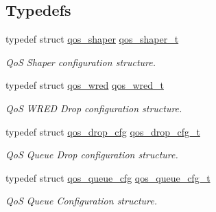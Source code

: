 \subsection*{Typedefs}
\begin{DoxyCompactItemize}
\item 
\hypertarget{group__FAPI__QOS__QUEUE_ga05ce7ada7ae20b289d4e675ad099c8f0}{typedef struct \hyperlink{structqos__shaper}{qos\-\_\-shaper} \hyperlink{group__FAPI__QOS__QUEUE_ga05ce7ada7ae20b289d4e675ad099c8f0}{qos\-\_\-shaper\-\_\-t}}\label{group__FAPI__QOS__QUEUE_ga05ce7ada7ae20b289d4e675ad099c8f0}

\begin{DoxyCompactList}\small\item\em Qo\-S Shaper configuration structure. \end{DoxyCompactList}\item 
typedef struct \hyperlink{structqos__wred}{qos\-\_\-wred} \hyperlink{group__FAPI__QOS__QUEUE_ga42b4d8fefa10f2b563d6151e772c6b3c}{qos\-\_\-wred\-\_\-t}
\begin{DoxyCompactList}\small\item\em Qo\-S W\-R\-E\-D Drop configuration structure. \end{DoxyCompactList}\item 
\hypertarget{group__FAPI__QOS__QUEUE_ga5db7cfdc67250c1a25470eb030e4fccb}{typedef struct \hyperlink{structqos__drop__cfg}{qos\-\_\-drop\-\_\-cfg} \hyperlink{group__FAPI__QOS__QUEUE_ga5db7cfdc67250c1a25470eb030e4fccb}{qos\-\_\-drop\-\_\-cfg\-\_\-t}}\label{group__FAPI__QOS__QUEUE_ga5db7cfdc67250c1a25470eb030e4fccb}

\begin{DoxyCompactList}\small\item\em Qo\-S Queue Drop configuration structure. \end{DoxyCompactList}\item 
\hypertarget{group__FAPI__QOS__QUEUE_gaa27a8975bf3ed923f280f804086e1e4e}{typedef struct \hyperlink{structqos__queue__cfg}{qos\-\_\-queue\-\_\-cfg} \hyperlink{group__FAPI__QOS__QUEUE_gaa27a8975bf3ed923f280f804086e1e4e}{qos\-\_\-queue\-\_\-cfg\-\_\-t}}\label{group__FAPI__QOS__QUEUE_gaa27a8975bf3ed923f280f804086e1e4e}

\begin{DoxyCompactList}\small\item\em Qo\-S Queue Configuration structure. \end{DoxyCompactList}\end{DoxyCompactItemize}
